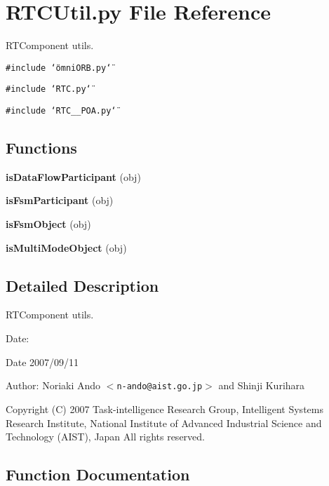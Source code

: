 \section{RTCUtil.py File Reference}
\label{RTCUtil_8py}
RTComponent utils. 

{\tt \#include \char`\"{}omni\-ORB.py\char`\"{}}\par
{\tt \#include \char`\"{}RTC.py\char`\"{}}\par
{\tt \#include \char`\"{}RTC\_\-\_\-POA.py\char`\"{}}\par
\subsection*{Functions}
\begin{CompactItemize}
\item 
{\bf is\-Data\-Flow\-Participant} (obj)
\item 
{\bf is\-Fsm\-Participant} (obj)
\item 
{\bf is\-Fsm\-Object} (obj)
\item 
{\bf is\-Multi\-Mode\-Object} (obj)
\end{CompactItemize}


\subsection{Detailed Description}
RTComponent utils. 

\begin{Desc}
\item[Date:]\begin{Desc}
\item[Date]2007/09/11 \end{Desc}
\end{Desc}
\begin{Desc}
\item[Author:]Noriaki Ando $<${\tt n-ando@aist.go.jp}$>$ and Shinji Kurihara\end{Desc}
Copyright (C) 2007 Task-intelligence Research Group, Intelligent Systems Research Institute, National Institute of Advanced Industrial Science and Technology (AIST), Japan All rights reserved.

\subsection{Function Documentation}

